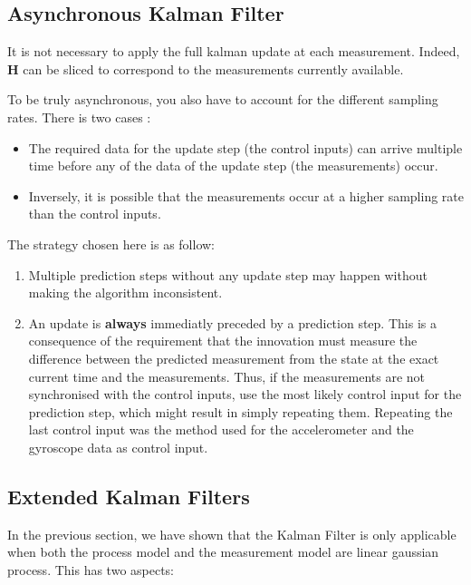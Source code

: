 \documentclass[12pt,]{article}
\providecommand{\tightlist}{%
  \setlength{\itemsep}{0pt}\setlength{\parskip}{0pt}}
\begin{document}
\subsection{Asynchronous Kalman
Filter}\label{asynchronous-kalman-filter}

It is not necessary to apply the full kalman update at each measurement.
Indeed, \(\mathbf{H}\) can be sliced to correspond to the measurements
currently available.

To be truly asynchronous, you also have to account for the different
sampling rates. There is two cases :

\begin{itemize}
\tightlist
\item
  The required data for the update step (the control inputs) can arrive
  multiple time before any of the data of the update step (the
  measurements) occur.
\item
  Inversely, it is possible that the measurements occur at a higher
  sampling rate than the control inputs.
\end{itemize}

The strategy chosen here is as follow:

\begin{enumerate}
\def\labelenumi{\arabic{enumi}.}
\tightlist
\item
  Multiple prediction steps without any update step may happen without
  making the algorithm inconsistent.
\item
  An update is \textbf{always} immediatly preceded by a prediction step.
  This is a consequence of the requirement that the innovation must
  measure the difference between the predicted measurement from the
  state at the exact current time and the measurements. Thus, if the
  measurements are not synchronised with the control inputs, use the
  most likely control input for the prediction step, which might result
  in simply repeating them. Repeating the last control input was the
  method used for the accelerometer and the gyroscope data as control
  input.
\end{enumerate}

\subsection{Extended Kalman Filters}\label{extended-kalman-filters}

In the previous section, we have shown that the Kalman Filter is only
applicable when both the process model and the measurement model are
linear gaussian process. This has two aspects:
\end{document}
